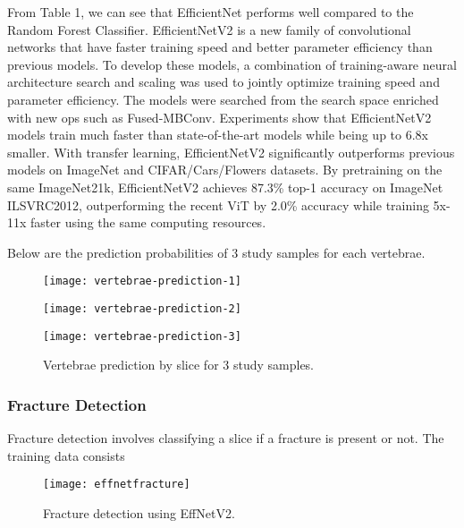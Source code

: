 \documentclass[pdflatex,sn-mathphys]{sn-jnl}%
\theoremstyle{thmstyleone}%
\theoremstyle{thmstyletwo}%
\theoremstyle{thmstylethree}%
\begin{document}
From Table 1, we can see that EfficientNet performs well compared to the Random Forest Classifier. EfficientNetV2 is a new family of convolutional networks that have faster training speed and better parameter efficiency than previous models. To develop these models, a combination of training-aware neural architecture search and scaling was used to jointly optimize training speed and parameter efficiency. The models were searched from the search space enriched with new ops such as Fused-MBConv\cite{Fused-MBConv}. Experiments show that EfficientNetV2 models train much faster than state-of-the-art models while being up to 6.8x smaller. With transfer learning, EfficientNetV2 significantly outperforms previous models on ImageNet and CIFAR/Cars/Flowers datasets\cite{DBLP:conf/icml/TanL21}. By pretraining on the same ImageNet21k, EfficientNetV2 achieves 87.3\% top-1 accuracy on ImageNet ILSVRC2012, outperforming the recent ViT by 2.0\% accuracy while training 5x-11x faster using the same computing resources.

Below are the prediction probabilities of 3 study samples for each vertebrae.
\begin{figure}[H]
 \begin{minipage}[c]{1\textwidth}
 \centering
    \texttt{[image: vertebrae-prediction-1]}
    \label{fig:mesh5.1}
\end{minipage}
\begin{minipage}[c]{1\textwidth}
 \centering
    \texttt{[image: vertebrae-prediction-2]}
    \label{fig:mesh5.2}
\end{minipage}
 \begin{minipage}[c]{1\textwidth}
 \centering
    \texttt{[image: vertebrae-prediction-3]}
    \label{fig:mesh5.3}
\end{minipage}
\caption{\centering\footnotesize{ Vertebrae prediction by slice for 3 study samples. }}
\end{figure}

\subsubsection{Fracture Detection}\label{subsubsec2}

Fracture detection involves classifying a slice if a fracture is present or not. The training data consists 

\begin{figure}[H]
 \begin{minipage}[c]{1\textwidth}
 \centering
    \texttt{[image: effnetfracture]}
    \caption{\centering\footnotesize{ Fracture detection using EffNetV2. }}
    \label{fig:mesh6}
\end{minipage}
\end{figure}
\end{document}
